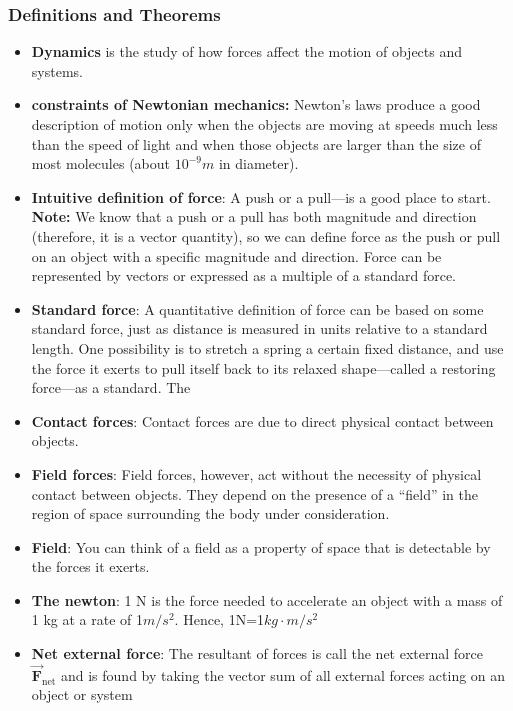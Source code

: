 \documentclass{report}
\begin{document}
        \subsubsection{Definitions and Theorems}
        \begin{itemize}
            \item  \textbf{Dynamics} is the study of how forces affect the motion of objects and systems.
            \item \textbf{constraints of Newtonian mechanics:} Newton’s laws produce a good description of motion only when the objects are moving at speeds much less than the speed of light and when those objects are larger than the size of most molecules (about  $10^{-9}m$ in diameter).
            \item \textbf{Intuitive definition of force}: A push or a pull—is a good place to start.
                \bigbreak \noindent 
                \textbf{Note:} We know that a push or a pull has both magnitude and direction (therefore, it is a vector quantity), so we can define force as the push or pull on an object with a specific magnitude and direction. Force can be represented by vectors or expressed as a multiple of a standard force.
            \item \textbf{Standard force}: A quantitative definition of force can be based on some standard force, just as distance is measured in units relative to a standard length. One possibility is to stretch a spring a certain fixed distance, and use the force it exerts to pull itself back to its relaxed shape—called a restoring force—as a standard. The
            \item \textbf{Contact forces}: Contact forces are due to direct physical contact between objects.
            \item \textbf{Field forces}: Field forces, however, act without the necessity of physical contact between objects. They depend on the presence of a “field” in the region of space surrounding the body under consideration.
            \item \textbf{Field}: You can think of a field as a property of space that is detectable by the forces it exerts.
            \item \textbf{The newton}: 1 N is the force needed to accelerate an object with a mass of 1 kg at a rate of  1$m/s^{2} $. Hence, 1N=1$kg\cdot m/s^{2}$
            \item \textbf{Net external force}: The resultant of forces is call the net external force $\vec{\mathbf{F}}_{\text{net}}$ and is found by taking the vector sum of all external forces acting on an object or system

\end{itemize}
\end{document}
